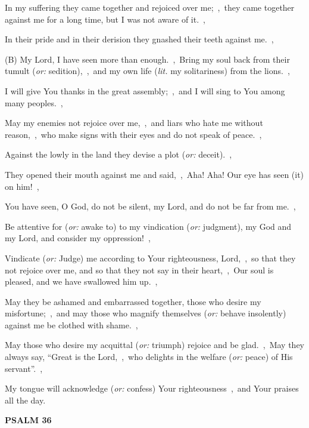\documentclass[12pt,twoside,a5paper]{article}
\newcommand{\psalm}[1]{\textbf{PSALM {#1}}\nopagebreak}
\newcommand{\translationoption}[1]{\emph{or:} #1}
\newcommand{\translationliteral}[1]{\emph{lit.} #1}
\begin{document}
\begin{normalparskip}
  In my suffering they came together and rejoiced over me;~\sep\ they came together against me for a long time, but I was not aware of it.~\sep

  In their pride and in their derision they gnashed their teeth against me.~\sep

  (B) My Lord, I have seen more than enough.~\sep\ Bring my soul back from their tumult (\translationoption{sedition}),~\sep\ and my own life (\translationliteral{my solitariness}) from the lions.~\sep

  I will give You thanks in the great assembly;~\sep\ and I will sing to You among many peoples.~\sep

  May my enemies not rejoice over me,~\sep\ and liars who hate me without reason,~\sep\ who make signs with their eyes and do not speak of peace.~\sep

  Against the lowly in the land they devise a plot (\translationoption{deceit}).~\sep

  They opened their mouth against me and said,~\sep\ Aha! Aha! Our eye has seen (it) on him!~\sep

  You have seen, O God, do not be silent, my Lord, and do not be far from me.~\sep

  Be attentive for (\translationoption{awake to}) to my vindication (\translationoption{judgment}), my God and my Lord, and consider my oppression!~\sep

  Vindicate (\translationoption{Judge}) me according to Your righteousness, Lord,~\sep\ so that they not rejoice over me, and so that they not say in their heart,~\sep\ Our soul is pleased, and we have swallowed him up.~\sep

  May they be ashamed and embarrassed together, those who desire my misfortune;~\sep\ and may those who magnify themselves (\translationoption{behave insolently}) against me be clothed with shame.~\sep

  May those who desire my acquittal (\translationoption{triumph}) rejoice and be glad.~\sep\ May they always say, ``Great is the Lord,~\sep\ who delights in the welfare (\translationoption{peace}) of His servant''.~\sep

  My tongue will acknowledge (\translationoption{confess}) Your righteousness~\sep\ and Your praises all the day.
\end{normalparskip}

\psalm{36}
\end{document}
